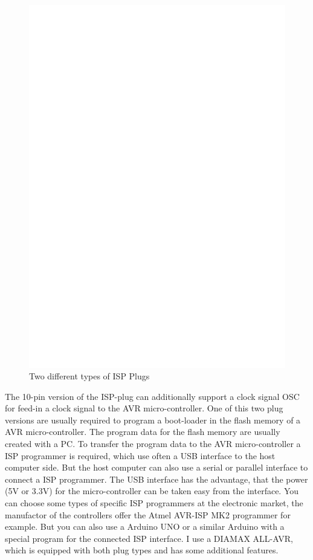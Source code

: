 \begin{figure}[H]
\centering
\includegraphics[width=12cm]{../FIG/ISP.eps}
\caption{Two different types of ISP Plugs}
\label{fig:ISP}
\end{figure}

The 10-pin version of the ISP-plug can additionally support a clock signal OSC
for feed-in a clock signal to the AVR micro-controller.
One of this two plug versions are usually required to program a boot-loader in
the flash memory of a AVR micro-controller. The program data
for the flash memory are usually created with a PC.
To transfer the program data to the AVR micro-controller a ISP programmer
is required, which use often a USB interface to the host computer side.
But the host computer can also use a serial or parallel interface to
connect a ISP programmer.
The USB interface has the advantage, that the power (5V or 3.3V) for
the micro-controller can be taken easy from the interface.
You can choose some types of specific ISP programmers at the electronic market,
the manufactor of the controllers offer the Atmel AVR-ISP MK2 programmer for example.
But you can also use a Arduino UNO or a similar Arduino with
a special program for the connected ISP interface.
I use a DIAMAX ALL-AVR, which is equipped with both plug types
and has some additional features.

